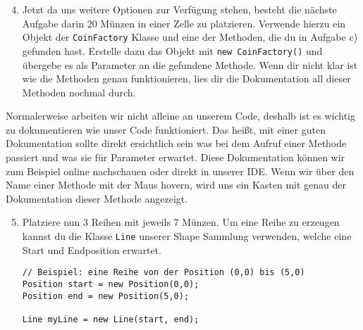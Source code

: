 \begin{enumerate} \setcounter{enumi}{3}
    \item Jetzt da uns weitere Optionen zur Verfügung stehen, besteht die nächste Aufgabe darin 20 Münzen in einer Zelle zu platzieren. Verwende hierzu ein Objekt der \texttt{CoinFactory} Klasse und eine der Methoden, die du in Aufgabe c) gefunden hast. Erstelle dazu das Objekt mit \texttt{new CoinFactory()} und übergebe es als Parameter an die gefundene Methode. Wenn dir nicht klar ist wie die Methoden genau funktionieren, lies dir die Dokumentation all dieser Methoden nochmal durch.

\end{enumerate}

\begin{Infobox}
    Normalerweise arbeiten wir nicht alleine an unserem Code, deshalb ist es wichtig zu dokumentieren wie unser Code funktioniert. Das heißt, mit einer guten Dokumentation sollte direkt ersichtlich sein was bei dem Aufruf einer Methode passiert und was sie für Parameter erwartet. Diese Dokumentation können wir zum Beispiel online nachschauen oder direkt in unserer IDE. Wenn wir über den Name einer Methode mit der Maus hovern, wird uns ein Kasten mit genau der Dokumentation dieser Methode angezeigt.
\end{Infobox}


\begin{enumerate} \setcounter{enumi}{4}
    \item Platziere nun 3 Reihen mit jeweils 7 Münzen. Um eine Reihe zu erzeugen kannst du die Klasse \texttt{Line} unserer Shape Sammlung verwenden, welche eine Start und Endposition erwartet.

    \begin{lstlisting}
// Beispiel: eine Reihe von der Position (0,0) bis (5,0)
Position start = new Position(0,0);
Position end = new Position(5,0);

Line myLine = new Line(start, end);
    \end{lstlisting}

\end{enumerate}
